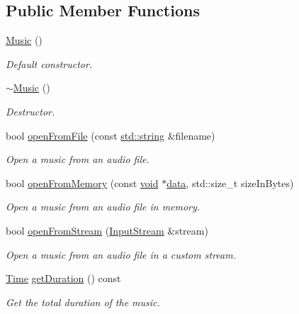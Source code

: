 \subsection*{Public Member Functions}
\begin{DoxyCompactItemize}
\item 
\hyperlink{classsf_1_1_music_a0bc787d8e022b3a9b89cf2c28befd42e}{Music} ()
\begin{DoxyCompactList}\small\item\em Default constructor. \end{DoxyCompactList}\item 
\hyperlink{classsf_1_1_music_a4c65860fed2f01d0eaa6c4199870414b}{$\sim$\-Music} ()
\begin{DoxyCompactList}\small\item\em Destructor. \end{DoxyCompactList}\item 
bool \hyperlink{classsf_1_1_music_a3edc66e5f5b3f11e84b90eaec9c7d7c0}{open\-From\-File} (const \hyperlink{gl3_8h_ac83513893df92266f79a515488701770}{std\-::string} \&filename)
\begin{DoxyCompactList}\small\item\em Open a music from an audio file. \end{DoxyCompactList}\item 
bool \hyperlink{classsf_1_1_music_ae93b21bcf28ff0b5fec458039111386e}{open\-From\-Memory} (const \hyperlink{glutf90_8h_ac778d6f63f1aaf8ebda0ce6ac821b56e}{void} $\ast$\hyperlink{gl3_8h_a0f78eecb0891cce3bdfc815b971866a1}{data}, std\-::size\-\_\-t size\-In\-Bytes)
\begin{DoxyCompactList}\small\item\em Open a music from an audio file in memory. \end{DoxyCompactList}\item 
bool \hyperlink{classsf_1_1_music_a4e55d1910a26858b44778c26b237d673}{open\-From\-Stream} (\hyperlink{classsf_1_1_input_stream}{Input\-Stream} \&stream)
\begin{DoxyCompactList}\small\item\em Open a music from an audio file in a custom stream. \end{DoxyCompactList}\item 
\hyperlink{classsf_1_1_time}{Time} \hyperlink{classsf_1_1_music_af4738b69c4c5038f71414ad7ffbbdc2b}{get\-Duration} () const 
\begin{DoxyCompactList}\small\item\em Get the total duration of the music. \end{DoxyCompactList}\end{DoxyCompactItemize}
